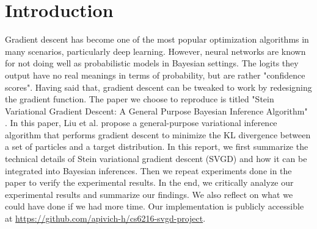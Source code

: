 \section{Introduction}
Gradient descent has become one of the most popular optimization algorithms in many scenarios, particularly deep learning. However, neural networks are known for not doing well as probabilistic models in Bayesian settings. The logits they output have no real meanings in terms of probability, but are rather "confidence scores". Having said that, gradient descent can be tweaked to work by redesigning the gradient function. The paper we choose to reproduce is titled "Stein Variational Gradient Descent: A General Purpose Bayesian Inference Algorithm" \cite{ref_article_svgd}. In this paper, Liu et al. propose a general-purpose variational inference algorithm that performs gradient descent to minimize the KL divergence between a set of particles and a target distribution. In this report, we first summarize the technical details of Stein variational gradient descent (SVGD) and how it can be integrated into Bayesian inferences. Then we repeat experiments done in the paper to verify the experimental results. In the end, we critically analyze our experimental results and summarize our findings. We also reflect on what we could have done if we had more time. Our implementation is publicly accessible at \url{https://github.com/apivich-h/cs6216-svgd-project}.